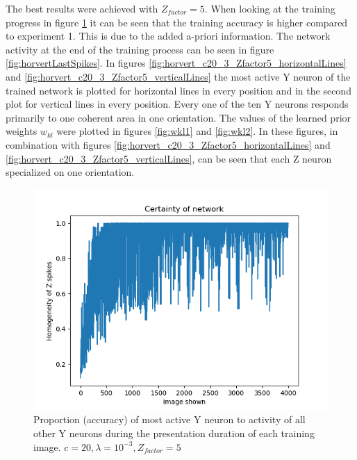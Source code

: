 The best results were achieved with $Z_{factor} = 5$. When looking at the training progress in figure \ref{fig:horvert_c20_3_Zfactor5_averageZ} it can be seen that the training accuracy is higher compared to experiment 1. This is due to the added a-priori information. The network activity at the end of the training process can be seen in figure \ref{fig:horvertLastSpikes}. In figures \ref{fig:horvert_c20_3_Zfactor5_horizontalLines} and \ref{fig:horvert_c20_3_Zfactor5_verticalLines} the most active Y neuron of the trained network is plotted for horizontal lines in every position and in the second plot for vertical lines in every position. Every one of the ten Y neurons responds primarily to one coherent area in one orientation. The values of the learned prior weights $w_{kl}$ were plotted in figures \ref{fig:wkl1} and \ref{fig:wkl2}. In these figures, in combination with figures \ref{fig:horvert_c20_3_Zfactor5_horizontalLines} and \ref{fig:horvert_c20_3_Zfactor5_verticalLines}, can be seen that each Z neuron specialized on one orientation.

\begin{figure}
  \includegraphics[width=\linewidth]{figures/horvert/horvert_c20_3_Zfactor5_averageZ.png}
  \caption{Proportion (accuracy) of most active Y neuron  to activity of all other Y neurons during the presentation duration of each training image. $c = 20, \lambda = 10^{-3}, Z_{factor} = 5$}
  \label{fig:horvert_c20_3_Zfactor5_averageZ}
\end{figure}

